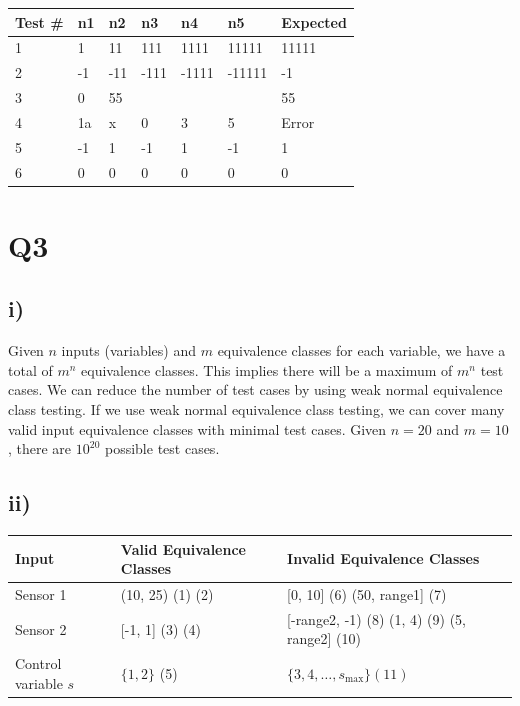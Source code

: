\documentclass[12pt, letterpaper, titlepage]{article}
\begin{document}
\begin{tabularx}{\textwidth}{|X|X|X|X|X|X|X|}
    \hline
    \textbf{Test \#} & \textbf{n1} & \textbf{n2} & \textbf{n3} & \textbf{n4} & \textbf{n5} & \textbf{Expected} \\
    \hline
    1 & 1 & 11 & 111 & 1111 & 11111 & 11111 \\
    \hline
    2 & -1 & -11 & -111 & -1111 & -11111 & -1 \\
    \hline
    3 & 0 & 55 &  &  &  & 55 \\
    \hline
    4 & 1a & x & 0 & 3 & 5 & Error \\
    \hline
    5 & -1 & 1 & -1 & 1 & -1 & 1 \\
    \hline
    6 & 0 & 0 & 0 & 0 & 0 & 0 \\
    \hline
 \end{tabularx}
 
\section*{Q3}
\subsection*{i)}
Given $n$ inputs (variables) and $m$ equivalence classes for each variable, we have a total of $m^n$ equivalence classes. This implies there will be a maximum of $m^n$ test cases. We can reduce the number of test cases by using weak normal equivalence class testing. If we use weak normal equivalence class testing, we can cover many valid input equivalence classes with minimal test cases. Given $n=20$ and $m=10$, there are $10^{20}$ possible test cases.

\subsection*{ii)}
\noindent
\begin{tabularx}{\textwidth}{|X|X|X|}
    \hline
    \textbf{Input} & \textbf{Valid Equivalence Classes} & \textbf{Invalid Equivalence Classes} \\
    \hline
    Sensor 1 & (10, 25) (1) \newline [15, 50] (2) & [0, 10] (6) \newline (50, range1] (7) \\
    \hline
    Sensor 2 & [-1, 1] (3) \newline [4, 5] (4) & [-range2, -1) (8) \newline (1, 4) (9) \newline (5, range2] (10) \\
    \hline
    Control variable $s$ & $\{1, 2\}$ (5) & $\{3, 4, \ldots, s_\text{max}\} (11) $ \\
    \hline
 \end{tabularx}
\end{document}
